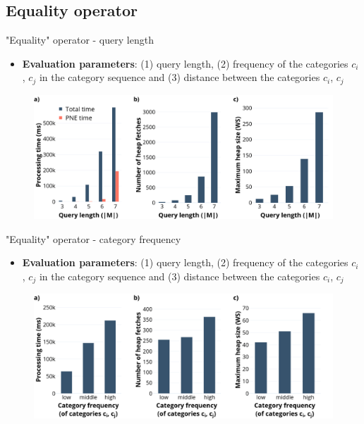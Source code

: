 \documentclass[18pt]{beamer}
\begin{document}
	\subsection{Equality operator}
		\begin{frame}{"Equality" operator - query length}
		
			\begin{itemize}
				\item \textbf{Evaluation parameters}: (1) query length, (2) frequency of the categories $c_i$, $c_j$ in the category sequence and (3) distance between the categories $c_i$, $c_j$
			\end{itemize}
		
			\begin{figure}[h]
				\includegraphics[scale=0.275]{eo_length_orange.png}
			\end{figure}
		
		\end{frame}
	
		\begin{frame}{"Equality" operator - category frequency}
		
			\begin{itemize}
				\item \textbf{Evaluation parameters}: (1) query length, (2) frequency of the categories $c_i$, $c_j$ in the category sequence and (3) distance between the categories $c_i$, $c_j$
			\end{itemize}
			
			\begin{figure}[h]
				\includegraphics[scale=0.275]{eo_frequency.png}
			\end{figure}
		
		\end{frame}
	
\end{document}
